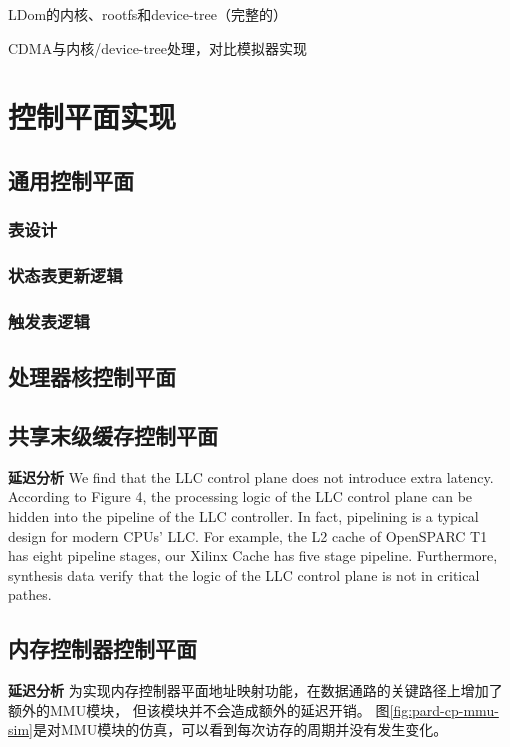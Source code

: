 LDom的内核、rootfs和device-tree（完整的）

CDMA与内核/device-tree处理，对比模拟器实现


\section{控制平面实现}

\subsection{通用控制平面}

\subsubsection*{表设计}
\subsubsection*{状态表更新逻辑}
\subsubsection*{触发表逻辑}


\subsection{处理器核控制平面}
\label{chap:impl:corecp}

\subsection{共享末级缓存控制平面}
\label{chap:impl:cachecp}


\textbf{延迟分析}\quad
We find that the LLC control plane does not introduce
extra latency. According to Figure 4, the processing logic of the
LLC control plane can be hidden into the pipeline of the LLC
controller. In fact, pipelining is a typical design for modern CPUs’
LLC. For example, the L2 cache of OpenSPARC T1 has eight
pipeline stages, our Xilinx Cache has five stage pipeline.
Furthermore, synthesis data verify that the logic
of the LLC control plane is not in critical pathes.


\subsection{内存控制器控制平面}
\label{chap:impl:migcp}

\textbf{延迟分析}\quad
为实现内存控制器平面地址映射功能，在数据通路的关键路径上增加了额外的MMU模块，
但该模块并不会造成额外的延迟开销。
图\ref{fig:pard-cp-mmu-sim}是对MMU模块的仿真，可以看到每次访存的周期并没有发生变化。


